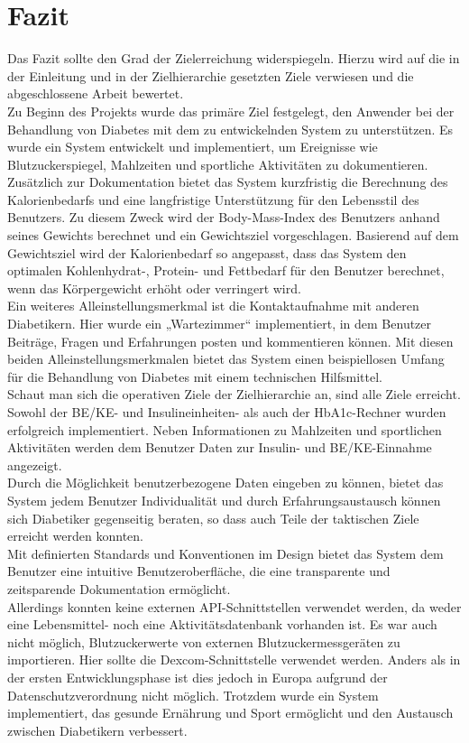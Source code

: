 \section{Fazit}
	Das Fazit sollte den Grad der Zielerreichung widerspiegeln. Hierzu wird auf die in der Einleitung und in der Zielhierarchie gesetzten Ziele verwiesen und die abgeschlossene Arbeit bewertet.\\
	Zu Beginn des Projekts wurde das primäre Ziel festgelegt, den Anwender bei der Behandlung von Diabetes mit dem zu entwickelnden System zu unterstützen. Es wurde ein System entwickelt und implementiert, um Ereignisse wie Blutzuckerspiegel, Mahlzeiten und sportliche Aktivitäten zu dokumentieren. Zusätzlich zur Dokumentation bietet das System kurzfristig die Berechnung des Kalorienbedarfs und eine langfristige Unterstützung für den Lebensstil des Benutzers. Zu diesem Zweck wird der Body-Mass-Index des Benutzers anhand seines Gewichts berechnet und ein Gewichtsziel vorgeschlagen. Basierend auf dem Gewichtsziel wird der Kalorienbedarf so angepasst, dass das System den optimalen Kohlenhydrat-, Protein- und Fettbedarf für den Benutzer berechnet, wenn das Körpergewicht erhöht oder verringert wird.\\
	Ein weiteres Alleinstellungsmerkmal ist die Kontaktaufnahme mit anderen Diabetikern. Hier wurde ein „Wartezimmer“ implementiert, in dem Benutzer Beiträge, Fragen und Erfahrungen posten und kommentieren können. Mit diesen beiden Alleinstellungsmerkmalen bietet das System einen beispiellosen Umfang für die Behandlung von Diabetes mit einem technischen Hilfsmittel.\\
	Schaut man sich die operativen Ziele der Zielhierarchie an, sind alle Ziele erreicht. Sowohl der BE/KE- und Insulineinheiten- als auch der HbA1c-Rechner wurden erfolgreich implementiert. Neben Informationen zu Mahlzeiten und sportlichen Aktivitäten werden dem Benutzer Daten zur Insulin- und BE/KE-Einnahme angezeigt.\\
	Durch die Möglichkeit benutzerbezogene Daten eingeben zu können, bietet das System jedem Benutzer Individualität und durch Erfahrungsaustausch können sich Diabetiker gegenseitig beraten, so dass auch Teile der taktischen Ziele erreicht werden konnten.\\
	Mit definierten Standards und Konventionen im Design bietet das System dem Benutzer eine intuitive Benutzeroberfläche, die eine transparente und zeitsparende Dokumentation ermöglicht.\\
	Allerdings konnten keine externen API-Schnittstellen verwendet werden, da weder eine Lebensmittel- noch eine Aktivitätsdatenbank vorhanden ist. Es war auch nicht möglich, Blutzuckerwerte von externen Blutzuckermessgeräten zu importieren. Hier sollte die Dexcom-Schnittstelle verwendet werden. Anders als in der ersten Entwicklungsphase ist dies jedoch in Europa aufgrund der Datenschutzverordnung nicht möglich. Trotzdem wurde ein System implementiert, das gesunde Ernährung und Sport ermöglicht und den Austausch zwischen Diabetikern verbessert.\\
